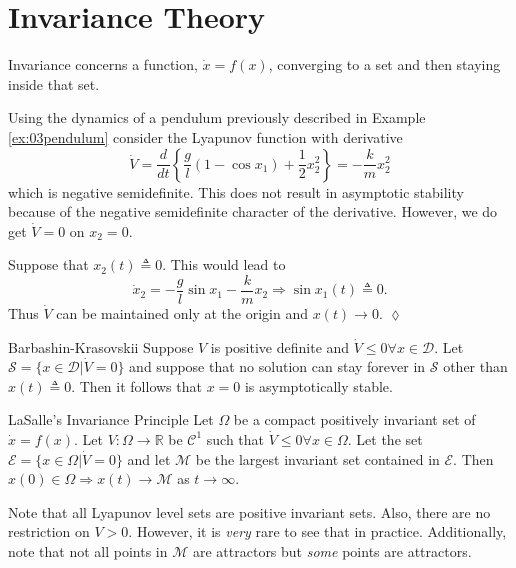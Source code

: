 
\mainmatter
\setcounter{page}{1}

\lectureseries[\course]{\course}

\date{February 9, 2010}

\setaddress

\setcounter{lecture}{10}
\setcounter{chapter}{10}


\section{Invariance Theory}
Invariance concerns a function, $\dot{x}=f(x)$, converging to a set and then staying inside that set.

\begin{example}
Using the dynamics of a pendulum previously described in Example \ref{ex:03pendulum} consider the Lyapunov function with derivative
$$\dot{V} = \frac{d}{dt}\left\{\frac{g}{l}\left(1-\cos x_1\right) + \frac{1}{2}x_2^2\right\} = -\frac{k}{m}x_2^2$$
which is negative semidefinite. This does not result in asymptotic stability because of the negative semidefinite character of the derivative. However, we do get $\dot{V}=0$ on $x_2=0$.

Suppose that $x_2(t)\triangleq0$. This would lead to
$$\dot{x}_2 = -\frac{g}{l}\sin x_1 - \frac{k}{m}x_2 \Rightarrow \sin x_1(t) \triangleq 0.$$
Thus $\dot{V}$ can be maintained only at the origin and $x(t)\to0$.
$\lozenge$
\end{example}

\begin{theorem}{Barbashin-Krasovskii}
Suppose $V$ is positive definite and $\dot{V}\leq0 \forall x\in\mathcal{D}$. Let $\mathcal{S}=\{x\in\mathcal{D} | \dot{V} = 0\}$ and suppose that no solution can stay forever in $\mathcal{S}$ other than $x(t)\triangleq0$. Then it follows that $x=0$ is asymptotically stable.
\end{theorem}

\begin{theorem}{LaSalle's Invariance Principle}
Let $\Omega$ be a compact positively invariant set of $\dot{x}=f(x)$. Let $V:\Omega\to\mathbb{R}$ be $\mathcal{C}^1$ such that $\dot{V}\leq0 \forall x \in \Omega$. Let the set $\mathcal{E}=\{x\in\Omega | \dot{V}=0\}$ and let $\mathcal{M}$ be the largest invariant set contained in $\mathcal{E}$. Then $x(0)\in\Omega \Rightarrow x(t)\to\mathcal{M}$ as $t\to\infty$.
\end{theorem}
Note that all Lyapunov level sets are positive invariant sets. Also, there are no restriction on $V>0$. However, it is \textit{very} rare to see that in practice. Additionally, note that not all points in $\mathcal{M}$ are attractors but \textit{some} points are attractors.


